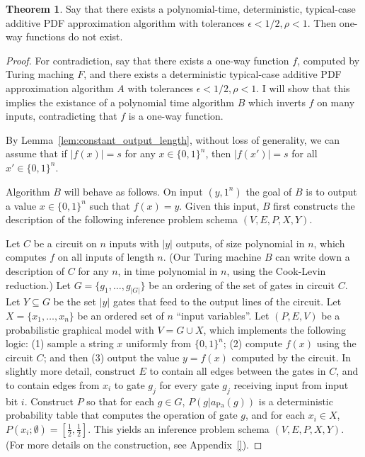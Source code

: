 \documentclass{article}
\theoremstyle{definition}
\newtheorem{thm}{Theorem}
\theoremstyle{remark}
\def \Pa{\text{Pa}}
\begin{document}
\begin{thm}
Say that there exists a polynomial-time, deterministic, typical-case additive PDF approximation algorithm with tolerances $\epsilon < 1/2, \rho < 1$.
Then one-way functions do not exist.
\end{thm}
\begin{proof}
For contradiction, say that there exists a one-way function $f$, computed by Turing maching $F$,
and there exists a deterministic typical-case additive PDF approximation algorithm $A$ with tolerances $\epsilon < 1/2, \rho < 1$.
I will show that this implies the existance of a polynomial time algorithm $B$ which inverts $f$ on many inputs, contradicting that $f$ is a one-way function.

By Lemma~\ref{lem:constant_output_length}, without loss of generality, we can assume that if $|f(x)| = s$ for any $x \in \{0, 1\}^n$, then $|f(x')| = s$ for all $x' \in \{0, 1\}^n$.

Algorithm $B$ will behave as follows.
On input $(y, 1^n)$ the goal of $B$ is to output a value $x \in \{0, 1\}^n$ such that $f(x) = y$.
Given this input, $B$ first constructs the description of the following inference problem schema $(V, E, P, X, Y)$.

Let $C$ be a circuit on $n$ inputs with $|y|$ outputs, of size polynomial in $n$, which computes $f$ on all inputs of length $n$.
(Our Turing machine $B$ can write down a description of $C$ for any $n$, in time polynomial in $n$, using the Cook-Levin reduction.)
Let $G = \{g_1, \dots, g_|G|\}$ be an ordering of the set of gates in circuit $C$.
Let $Y \subseteq G$ be the set $|y|$ gates that feed to the output lines of the circuit.
Let $X = \{x_1, \dots, x_n\}$ be an ordered set of $n$ ``input variables''.
Let $(P, E, V)$ be a probabilistic graphical model with $V = G \cup X$,
which implements the following logic: (1) sample a string $x$ uniformly from $\{0, 1\}^n$; (2) compute $f(x)$ using the circuit $C$; and then (3) output the value $y = f(x)$ computed by the circuit.
In slightly more detail, construct $E$ to contain all edges between the gates in $C$, and to contain edges from $x_i$ to gate $g_j$ for every gate $g_j$ receiving input from input bit $i$.
Construct $P$ so that for each $g \in G$, $P(g | a_\Pa(g))$ is a deterministic probability table that computes the operation of gate $g$, and for each $x_i \in X$, $P(x_i ; \emptyset) = [\frac{1}{2}, \frac{1}{2}]$.
This yields an inference problem schema $(V, E, P, X, Y)$.
(For more details on the construction, see Appendix~\ref{}).


\end{proof}
\end{document}
